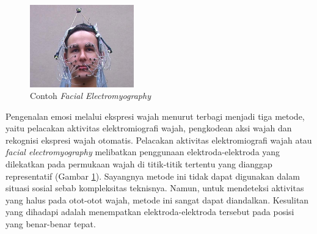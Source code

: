 \begin{figure}
    \vspace{-0.5cm}
    \centering
    \includegraphics[width=4.5cm]{gambar/27_active_motion_capture_sensors.jpg}
    \caption[Contoh \textit{Facial Electromyography}]{Contoh \textit{Facial Electromyography} \protect{}}
    \label{fig:contohfemg}
\end{figure}
Pengenalan emosi melalui ekspresi wajah menurut  terbagi menjadi tiga metode, yaitu pelacakan aktivitas elektromiografi wajah, pengkodean aksi wajah dan rekognisi ekspresi wajah otomatis. Pelacakan aktivitas elektromiografi wajah atau \textit{facial electromyography} melibatkan penggunaan elektroda-elektroda yang dilekatkan pada permukaan wajah di titik-titik tertentu yang dianggap representatif (Gambar \ref{fig:contohfemg}). Sayangnya metode ini tidak dapat digunakan dalam situasi sosial sebab kompleksitas teknisnya. Namun, untuk mendeteksi aktivitas yang halus pada otot-otot wajah, metode ini sangat dapat diandalkan. Kesulitan yang dihadapi adalah menempatkan elektroda-elektroda tersebut pada posisi yang benar-benar tepat.

